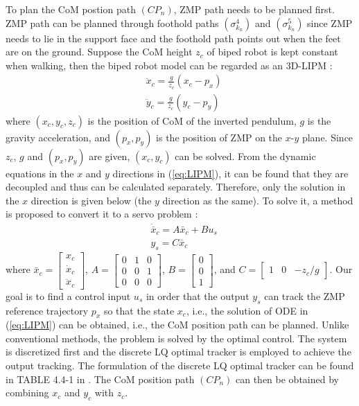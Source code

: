 \documentclass{ieeeaccess}
\begin{document}
To plan the CoM postion path $(CP_n)$, ZMP path needs to be planned first. ZMP path can be planned through foothold paths $(\sigma^{4}_{k_n})$ and $(\sigma^{5}_{k_n})$ since ZMP needs to lie in the support face and the foothold path points out when the feet are on the ground. Suppose the CoM height $z_c$ of biped robot is kept constant when walking, then the biped robot model can be regarded as an 3D-LIPM \cite{kajita2001real}:
\begin{equation} \label{eq:LIPM}
    \begin{split}
        & \ddot{x}_c = \frac{g}{z_c}(x_c - p_x) \\
        & \ddot{y}_c = \frac{g}{z_c}(y_c - p_y)
    \end{split}
\end{equation}
where $(x_c, y_c, z_c)$ is the position of CoM of the inverted pendulum, $g$ is the gravity acceleration, and $(p_x,p_y)$ is the position of ZMP on the $x$-$y$ plane. Since $z_c$, $g$ and $(p_x,p_y)$ are given, $(x_c, y_c)$ can be solved. From the dynamic equations in the $x$ and $y$ directions in (\ref{eq:LIPM}), it can be found that they are decoupled and thus can be calculated separately. Therefore, only the solution in the $x$ direction is given below (the $y$ direction as the same). To solve it, a method is proposed to convert it to a servo problem \cite{1241826}:
\begin{equation} \label{eq:output tracking}
    \begin{split}
        & \dot{\bar{x}}_c = A\bar{x}_c + Bu_s \\
        & y_s = C\bar{x}_c
    \end{split}
\end{equation}
where $\bar{x}_c = \begin{bmatrix}
    x_c \\ \dot{x}_c \\ \ddot{x}_c
\end{bmatrix}$, $A = \begin{bmatrix}
    0 & 1 & 0 \\ 0 & 0 & 1 \\ 0 & 0 & 0
\end{bmatrix}$, $B = \begin{bmatrix}
    0 \\ 0 \\ 1
\end{bmatrix}$, and $C = \begin{bmatrix}
    1 & 0 & -z_c/g
\end{bmatrix}$. Our goal is to find a control input $u_s$ in order that the output $y_s$ can track the ZMP reference trajectory $p_x$ so that the state $x_c$, i.e., the solution of ODE in (\ref{eq:LIPM}) can be obtained, i.e., the CoM position path can be planned. Unlike conventional methods, the problem is solved by the optimal control. The system is discretized first and the discrete LQ optimal tracker is employed to achieve the output tracking. The formulation of the discrete LQ optimal tracker can be found in TABLE 4.4-1 in \cite{lewis2012optimal}. The CoM position path $(CP_n)$ can then be obtained by combining $x_c$ and $y_c$ with $z_c$.
\end{document}
